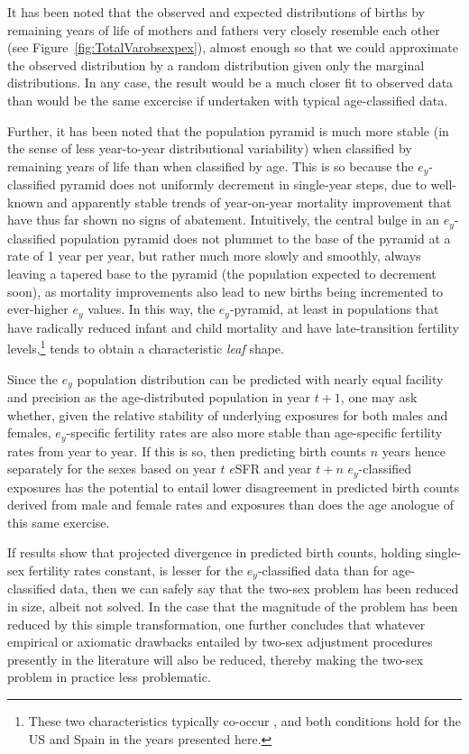 \FloatBarrier
\label{sec:exdivergence}
It has been noted that the observed and expected distributions of births by
remaining years of life of mothers and fathers very closely resemble each other
(see Figure~\ref{fig:TotalVarobsexpex}), almost enough so that we could
approximate the observed distribution by a random distribution given only the
marginal distributions. In any case, the result would be a much closer fit to
observed data than would be the same excercise if undertaken with typical
age-classified data. 

Further, it has been noted that the population pyramid is
much more stable (in the sense of less year-to-year
distributional variability) when classified by remaining years
of life than when classified by age. This is so because the $e_y$-classified 
pyramid does not uniformly decrement in single-year steps, due
to well-known and apparently stable trends of year-on-year mortality improvement
that have thus far shown no signs of abatement. Intuitively, the central bulge
in an $e_y$-classified population pyramid does not plummet to the base of the 
pyramid at a rate of 1
year per year, but rather much more slowly and smoothly, always leaving a
tapered base to the pyramid (the population expected to decrement soon), as
mortality improvements also lead to new births being incremented to ever-higher
$e_y$ values. In this way, the $e_y$-pyramid, at least in populations that have
radically reduced infant and child mortality and have late-transition fertility 
levels,\footnote{These two characteristics typically co-occur
\citep{macinnes2009reproductive}, and both conditions hold for the US and Spain
in the years presented here.} tends to obtain a characteristic \textit{leaf}
shape.

Since the $e_y$ population distribution can be predicted
with nearly equal facility and precision as the age-distributed population in
year $t+1$, one may ask whether, given the relative stability of underlying
exposures for both males and females, $e_y$-specific fertility rates are 
also more stable than
age-specific fertility rates from year to year. If this is so, then predicting 
birth counts $n$ years hence separately for the sexes based
on year $t$ $e$SFR and year $t + n$ $e_y$-classified exposures has the
potential to entail lower disagreement in predicted birth counts derived
from male and female rates and exposures than does the age
anologue of this same exercise.

If results show that projected divergence in predicted birth counts, holding
single-sex fertility rates constant, is lesser for the $e_y$-classified data
than for age-classified data, then we can safely say that the two-sex problem
has been reduced in size, albeit not solved. In the case that the magnitude of
the problem has been reduced by this simple transformation, one further
concludes that whatever empirical or axiomatic drawbacks entailed by 
two-sex adjustment procedures presently in the literature will also be reduced,
thereby making the two-sex problem in practice less problematic. 

